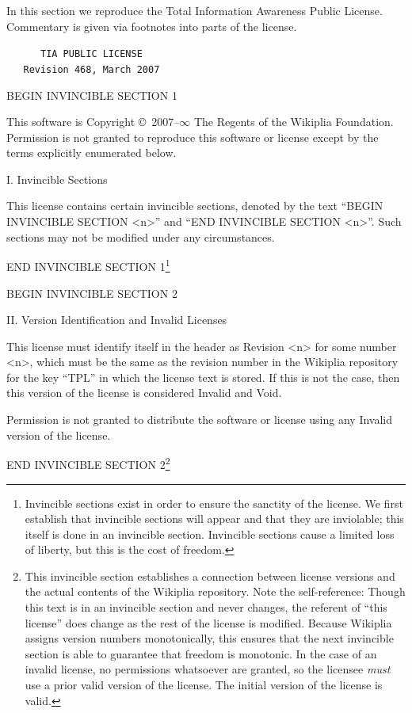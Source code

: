 \documentclass[twocolumn]{article}
\begin{document}
In this section we reproduce the Total Information Awareness Public
License. Commentary is given via footnotes into parts
of the license.

{\tt \parindent 0pt \parskip 10pt
\verb+     +TIA PUBLIC LICENSE \\
\verb+   +Revision 468, March 2007

BEGIN INVINCIBLE SECTION 1

This software is Copyright \copyright\ 2007{\large \rm--}$\infty$ The
Regents of the Wikiplia Foundation. Permission is not granted to
reproduce this software or license except by the terms explicitly
enumerated below.

I. Invincible Sections

This license contains certain invincible sections, denoted by the text
``BEGIN INVINCIBLE SECTION <n>'' and ``END INVINCIBLE SECTION <n>''.
Such sections may not be modified under any circumstances. 

END INVINCIBLE SECTION 1\footnote{Invincible sections exist in order
to ensure the sanctity of the license. We first establish that
invincible sections will appear and that they are inviolable; this
itself is done in an invincible section. Invincible sections cause a
limited loss of liberty, but this is the cost of freedom.}

BEGIN INVINCIBLE SECTION 2

II. Version Identification and Invalid Licenses

This license must identify itself in the header as Revision <n> for
some number <n>, which must be the same as the revision number in the
Wikiplia repository for the key ``TPL'' in which the license text is
stored. If this is not the case, then this version of the license is
considered Invalid and Void.

Permission is not granted to distribute the software or license using
any Invalid version of the license.

END INVINCIBLE SECTION 2\footnote{This invincible section establishes
a connection between license versions and the actual contents of the
Wikiplia repository. Note the self-reference: Though this text is in
an invincible section and never changes, the referent of ``this
license'' does change as the rest of the license is modified. Because
Wikiplia assigns version numbers monotonically, this ensures that the
next invincible section is able to guarantee that freedom is
monotonic. In the case of an invalid license, no permissions
whatsoever are granted, so the licensee {\em must} use a prior valid
version of the license. The initial version of the license is valid.}

}
\end{document}
